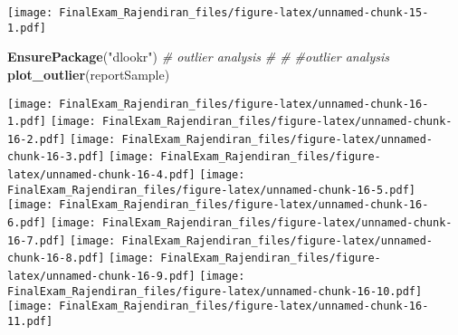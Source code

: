 \documentclass[]{article}
\newenvironment{Shaded}{\begin{snugshade}}{\end{snugshade}}
\newcommand{\CommentTok}[1]{\textcolor[rgb]{0.56,0.35,0.01}{\textit{#1}}}
\newcommand{\DataTypeTok}[1]{\textcolor[rgb]{0.13,0.29,0.53}{#1}}
\newcommand{\DecValTok}[1]{\textcolor[rgb]{0.00,0.00,0.81}{#1}}
\newcommand{\KeywordTok}[1]{\textcolor[rgb]{0.13,0.29,0.53}{\textbf{#1}}}
\newcommand{\NormalTok}[1]{#1}
\newcommand{\OperatorTok}[1]{\textcolor[rgb]{0.81,0.36,0.00}{\textbf{#1}}}
\newcommand{\OtherTok}[1]{\textcolor[rgb]{0.56,0.35,0.01}{#1}}
\newcommand{\StringTok}[1]{\textcolor[rgb]{0.31,0.60,0.02}{#1}}
\begin{document}
\begin{Shaded}
\end{Shaded}

\texttt{[image: FinalExam\_Rajendiran\_files/figure-latex/unnamed-chunk-15-1.pdf]}

\begin{Shaded}
\begin{Highlighting}[]
\KeywordTok{EnsurePackage}\NormalTok{(}\StringTok{"dlookr"}\NormalTok{) }\CommentTok{# outlier analysis}
\CommentTok{# # #outlier analysis}
\KeywordTok{plot_outlier}\NormalTok{(reportSample)}
\end{Highlighting}
\end{Shaded}

\texttt{[image: FinalExam\_Rajendiran\_files/figure-latex/unnamed-chunk-16-1.pdf]}
\texttt{[image: FinalExam\_Rajendiran\_files/figure-latex/unnamed-chunk-16-2.pdf]}
\texttt{[image: FinalExam\_Rajendiran\_files/figure-latex/unnamed-chunk-16-3.pdf]}
\texttt{[image: FinalExam\_Rajendiran\_files/figure-latex/unnamed-chunk-16-4.pdf]}
\texttt{[image: FinalExam\_Rajendiran\_files/figure-latex/unnamed-chunk-16-5.pdf]}
\texttt{[image: FinalExam\_Rajendiran\_files/figure-latex/unnamed-chunk-16-6.pdf]}
\texttt{[image: FinalExam\_Rajendiran\_files/figure-latex/unnamed-chunk-16-7.pdf]}
\texttt{[image: FinalExam\_Rajendiran\_files/figure-latex/unnamed-chunk-16-8.pdf]}
\texttt{[image: FinalExam\_Rajendiran\_files/figure-latex/unnamed-chunk-16-9.pdf]}
\texttt{[image: FinalExam\_Rajendiran\_files/figure-latex/unnamed-chunk-16-10.pdf]}
\texttt{[image: FinalExam\_Rajendiran\_files/figure-latex/unnamed-chunk-16-11.pdf]}
\end{document}
